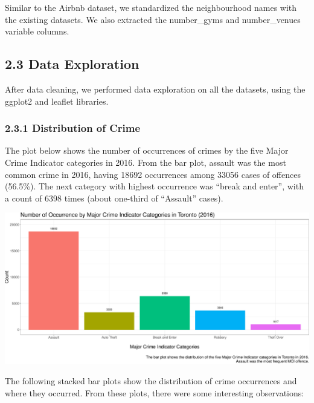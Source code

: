\documentclass[
]{article}
\begin{document}
Similar to the Airbnb dataset, we standardized the neighbourhood names
with the existing datasets. We also extracted the number\_gyms and
number\_venues variable columns.

\hypertarget{data-exploration}{%
\subsection{2.3 Data Exploration}\label{data-exploration}}

After data cleaning, we performed data exploration on all the datasets,
using the ggplot2 and leaflet libraries.

\hypertarget{distribution-of-crime}{%
\subsubsection{2.3.1 Distribution of
Crime}\label{distribution-of-crime}}

The plot below shows the number of occurrences of crimes by the five
Major Crime Indicator categories in 2016. From the bar plot, assault was
the most common crime in 2016, having 18692 occurrences among 33056
cases of offences (56.5\%). The next category with highest occurrence
was ``break and enter'', with a count of 6398 times (about one-third of
``Assault'' cases).

\includegraphics{Final-Report_files/figure-latex/crime-count-1.pdf}

The following stacked bar plots show the distribution of crime
occurrences and where they occurred. From these plots, there were some
interesting observations:
\end{document}
